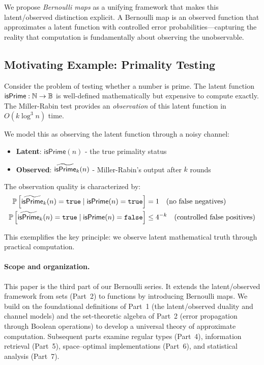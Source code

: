 \documentclass[11pt,final,hidelinks]{article}
\newcommand{\Nat}{\mathbb{N}}
\begin{document}
We propose \emph{Bernoulli maps} as a unifying framework that makes this latent/observed distinction explicit. A Bernoulli map is an observed function that approximates a latent function with controlled error probabilities—capturing the reality that computation is fundamentally about observing the unobservable.

\subsection{Motivating Example: Primality Testing}

Consider the problem of testing whether a number is prime. The latent function $\mathsf{isPrime} : \Nat \to \Bool$ is well-defined mathematically but expensive to compute exactly. The Miller-Rabin test \cite{miller1976,rabin1980} provides an \emph{observation} of this latent function in $O(k \log^3 n)$ time.

We model this as observing the latent function through a noisy channel:
\begin{itemize}
    \item \textbf{Latent}: $\mathsf{isPrime}(n)$ - the true primality status
    \item \textbf{Observed}: $\widetilde{\mathsf{isPrime}}_k(n)$ - Miller-Rabin's output after $k$ rounds
\end{itemize}

The observation quality is characterized by:
\begin{align}
\mathbb{P}\left[\widetilde{\mathsf{isPrime}}_k(n) = \mathtt{true} \mid \mathsf{isPrime}(n) = \mathtt{true}\right] &= 1 \quad \text{(no false negatives)} \\
\mathbb{P}\left[\widetilde{\mathsf{isPrime}}_k(n) = \mathtt{true} \mid \mathsf{isPrime}(n) = \mathtt{false}\right] &\leq 4^{-k} \quad \text{(controlled false positives)}
\end{align}

This exemplifies the key principle: we observe latent mathematical truth through practical computation.

\paragraph{Scope and organization.}  This paper is the third part of our Bernoulli series.  It extends the latent/observed framework from sets (Part~2) to functions by introducing Bernoulli maps.  We build on the foundational definitions of Part~1 (the latent/observed duality and channel models) and the set-theoretic algebra of Part~2 (error propagation through Boolean operations) to develop a universal theory of approximate computation.  Subsequent parts examine regular types (Part~4), information retrieval (Part~5), space–optimal implementations (Part~6), and statistical analysis (Part~7).
\end{document}
